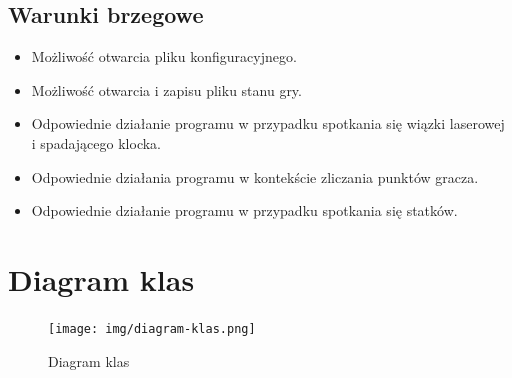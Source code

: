 \documentclass[a4paper]{article}
\begin{document}
\subsection{Warunki brzegowe}
\begin{itemize}
    \item Możliwość otwarcia pliku konfiguracyjnego.
    \item Możliwość otwarcia i zapisu pliku stanu gry.
    \item Odpowiednie działanie programu w przypadku spotkania się wiązki laserowej i spadającego klocka.
    \item Odpowiednie działania programu w kontekście zliczania punktów gracza.
    \item Odpowiednie działanie programu w przypadku spotkania się statków.
\end{itemize}

\section{Diagram klas}
\begin{figure}[H]
    \centering
    \texttt{[image: img/diagram-klas.png]}
    \caption{Diagram klas}
    \label{fig:diagram}
\end{figure}
\label{end}
\end{document}
